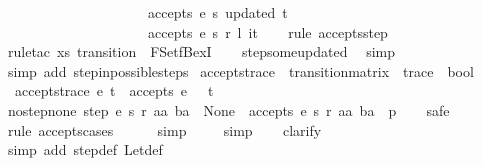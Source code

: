 \begin{isabellebody}
\ \ \ \ \ \ \ \ \ \ \ \ \ \ \ \ \ \ \ \ \ accepts\ e\ s{\isacharprime}\ updated\ t\ {\isasymLongrightarrow}\isanewline
\ \ \ \ \ \ \ \ \ \ \ \ \ \ \ \ \ \ \ \ \ accepts\ e\ s\ r\ {\isacharparenleft}{\isacharparenleft}l{\isacharcomma}\ i{\isacharparenright}{\isacharhash}t{\isacharparenright}{\isachardoublequoteclose}\isanewline
%
\isadelimproof
\ \ %
\endisadelimproof
%
\isatagproof
{}\isamarkupfalse%
\ {\isacharparenleft}rule\ accepts{\isachardot}step{\isacharparenright}\isanewline
\ \ \isamarkupfalse%
\ {\isacharparenleft}rule{\isacharunderscore}tac\ x{\isacharequal}{\isachardoublequoteopen}{\isacharparenleft}s{\isacharprime}{\isacharcomma}\ transition{\isacharparenright}{\isachardoublequoteclose}\ \ FSet{\isachardot}fBexI{\isacharparenright}\isanewline
\ \ \isamarkupfalse%
\ step{\isacharunderscore}some{\isacharunderscore}updated\ \isamarkupfalse%
\ simp\isanewline
\ \ \isamarkupfalse%
\ {\isacharparenleft}simp\ add{\isacharcolon}\ step{\isacharunderscore}in{\isacharunderscore}possible{\isacharunderscore}steps{\isacharparenright}%
\endisatagproof
{\isafoldproof}%
%
\isadelimproof
\isanewline
%
\endisadelimproof
\isanewline
{}\isamarkupfalse%
\ accepts{\isacharunderscore}trace\ {\isacharcolon}{\isacharcolon}\ {\isachardoublequoteopen}transition{\isacharunderscore}matrix\ {\isasymRightarrow}\ trace\ {\isasymRightarrow}\ bool{\isachardoublequoteclose}\ \isanewline
\ \ {\isachardoublequoteopen}accepts{\isacharunderscore}trace\ e\ t\ {\isasymequiv}\ accepts\ e\ {}\ {\isacharless}{\isachargreater}\ t{\isachardoublequoteclose}\isanewline
\isanewline
{}\isamarkupfalse%
\ no{\isacharunderscore}step{\isacharunderscore}none{\isacharcolon}\ {\isachardoublequoteopen}step\ e\ s\ r\ aa\ ba\ {\isacharequal}\ None\ {\isasymLongrightarrow}\ {\isasymnot}accepts\ e\ s\ r\ {\isacharparenleft}{\isacharparenleft}aa{\isacharcomma}\ ba{\isacharparenright}\ {\isacharhash}\ p{\isacharparenright}{\isachardoublequoteclose}\isanewline
%
\isadelimproof
\ \ %
\endisadelimproof
%
\isatagproof
{}\isamarkupfalse%
\ safe\isanewline
\ \ \isamarkupfalse%
\ {\isacharparenleft}rule\ accepts{\isachardot}cases{\isacharparenright}\isanewline
\ \ \ \ \isamarkupfalse%
\ simp\isanewline
\ \ \ \isamarkupfalse%
\ simp\isanewline
\ \ \isamarkupfalse%
\ clarify\isanewline
\ \ \isamarkupfalse%
\ {\isacharparenleft}simp\ add{\isacharcolon}\ step{\isacharunderscore}def\ Let{\isacharunderscore}def{\isacharparenright}\isanewline

\end{isabellebody}
